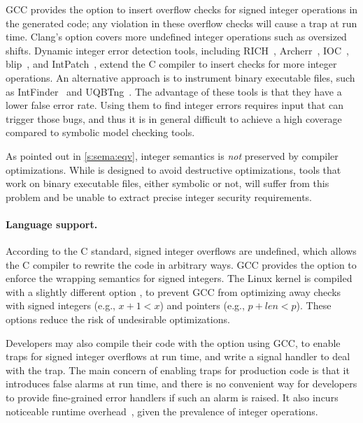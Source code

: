 GCC provides the option  to insert overflow checks for
signed integer operations in the generated code; any violation in
these overflow checks will cause a trap at run time.
%
Clang's  option covers more undefined
integer operations such as oversized shifts.
%
Dynamic integer error detection tools,
including
RICH~\cite{brumley:rich},
Archerr~\cite{archerr},
IOC~\cite{ioc},
blip~\cite{blip},
and
IntPatch~\cite{intpatch},
extend the C compiler to insert checks for more integer operations.
%
An alternative approach is to instrument binary executable files,
such as IntFinder~\cite{intfinder} and UQBTng~\cite{uqbtng}.
%
The advantage of these tools is that they have a lower false error rate.
Using them to find integer errors requires input that can trigger
those bugs, and thus it is in general difficult to achieve a high
coverage compared to symbolic model checking tools.

As pointed out in \autoref{s:sema:eqv}, integer semantics
is \emph{not} preserved by compiler optimizations.
While \sys is designed to avoid destructive optimizations, tools that
work on binary executable files, either symbolic or not,
will suffer from this problem and be unable to extract
precise integer security requirements.

\paragraph{Language support.}

According to the C standard, signed integer overflows are undefined,
which allows the C compiler to rewrite the code in arbitrary ways.
GCC provides the option  to enforce the wrapping semantics
for signed integers.  The Linux kernel is compiled with a slightly
different option , to prevent GCC from
optimizing away checks with signed integers (e.g., $x + 1 < x$) and
pointers (e.g., $p + \mathit{len} < p$).  These options reduce the
risk of undesirable optimizations.

Developers may also compile their code with the  option
using GCC, to enable traps for signed integer overflows at run time,
and write a signal handler to deal with the trap.
The main concern of enabling traps for production code
is that it introduces false alarms at run time, and there is no
convenient way for developers to provide fine-grained error handlers
if such an alarm is raised.  It also incurs noticeable runtime
overhead~\cite{ioc}, given the prevalence of integer operations.

